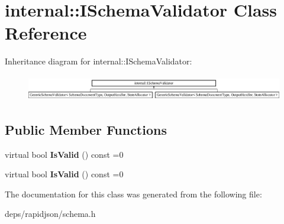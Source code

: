 \hypertarget{classinternal_1_1_i_schema_validator}{}\section{internal\+:\+:I\+Schema\+Validator Class Reference}
\label{classinternal_1_1_i_schema_validator}
Inheritance diagram for internal\+:\+:I\+Schema\+Validator\+:\begin{figure}[H]
\begin{center}
\leavevmode
\includegraphics[height=1.135903cm]{classinternal_1_1_i_schema_validator}
\end{center}
\end{figure}
\subsection*{Public Member Functions}
\begin{DoxyCompactItemize}
\item 
virtual bool {\bfseries Is\+Valid} () const  =0\hypertarget{classinternal_1_1_i_schema_validator_ad9c95f664966bec385dbe85f33a6ba3d}{}\label{classinternal_1_1_i_schema_validator_ad9c95f664966bec385dbe85f33a6ba3d}

\item 
virtual bool {\bfseries Is\+Valid} () const  =0\hypertarget{classinternal_1_1_i_schema_validator_ad9c95f664966bec385dbe85f33a6ba3d}{}\label{classinternal_1_1_i_schema_validator_ad9c95f664966bec385dbe85f33a6ba3d}

\end{DoxyCompactItemize}


The documentation for this class was generated from the following file\+:\begin{DoxyCompactItemize}
\item 
deps/rapidjson/schema.\+h\end{DoxyCompactItemize}
